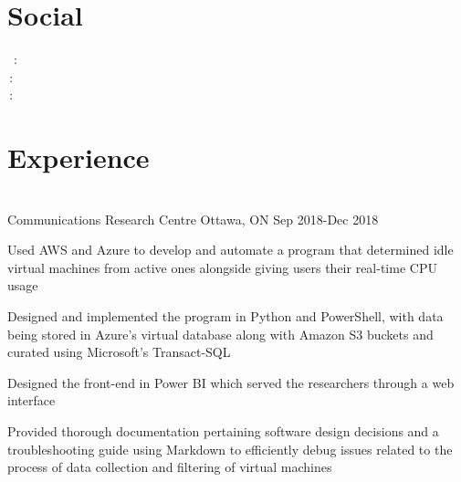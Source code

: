 \documentclass[]{deedy-resume-openfont}
\begin{document}
\begin{minipage}[t]{0.33\textwidth}
\section{Social}
\faLinkedinSquare \, :  \href{https://www.linkedin.com/in/mhabaig/}{} \\
\faGithubSquare \,: \href{https://github.com/HBaig30}{} \\
\faGlobe\,:\,\href{http://www.hamzais.me/}{}

\sectionsep



%
%

\end{minipage} 
\hfill
\begin{minipage}[t]{0.66\textwidth} 


\section{Experience}
\vspace{0.5em}
\\
{Communications Research Centre \textbullet{} Ottawa, ON \textbullet{} Sep 2018-Dec 2018}
\begin{tightemize}
\item Used AWS and Azure to develop and automate a program that determined idle virtual machines from active ones alongside giving users their real-time CPU usage 
\item Designed and implemented the program in Python and PowerShell, with data being stored in Azure’s virtual
database along with Amazon S3 buckets and curated using Microsoft’s Transact-SQL
\item Designed the front-end in Power BI which served the researchers through a web interface
\item Provided thorough documentation pertaining software design decisions and a troubleshooting guide using
Markdown to efficiently debug issues related to the process of data collection and filtering of virtual machines 


\end{tightemize}
\end{minipage}
\end{document}

